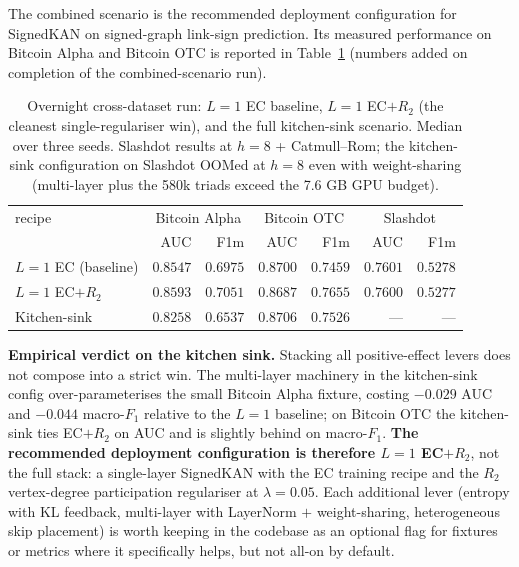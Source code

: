 \documentclass[11pt, a4paper]{article}
\begin{document}
The combined scenario is the recommended deployment configuration
for SignedKAN on signed-graph link-sign prediction. Its measured
performance on Bitcoin Alpha and Bitcoin OTC is reported in
Table~\ref{tab:kitchen-sink} (numbers added on completion of the
combined-scenario run).

\begin{table}[h]
\centering
\caption{Overnight cross-dataset run: $L\!=\!1$ EC baseline,
$L\!=\!1$ EC$+R_2$ (the cleanest single-regulariser win), and the
full kitchen-sink scenario. Median over three seeds. Slashdot
results at $h\!=\!8$ + Catmull--Rom; the kitchen-sink configuration
on Slashdot OOMed at $h\!=\!8$ even with weight-sharing
(multi-layer plus the 580k triads exceed the 7.6 GB GPU budget).}
\label{tab:kitchen-sink}
\begin{tabular}{@{}lrrrrrr@{}}
\toprule
recipe & \multicolumn{2}{c}{Bitcoin Alpha} & \multicolumn{2}{c}{Bitcoin OTC} & \multicolumn{2}{c}{Slashdot} \\
       & AUC & F1m & AUC & F1m & AUC & F1m \\
\midrule
$L\!=\!1$ EC (baseline) & $0.8547$ & $0.6975$ & $0.8700$ & $0.7459$ & $0.7601$ & $0.5278$ \\
$L\!=\!1$ EC$+R_2$      & $\mathbf{0.8593}$ & $\mathbf{0.7051}$ & $0.8687$ & $\mathbf{0.7655}$ & $0.7600$ & $0.5277$ \\
Kitchen-sink            & $0.8258$ & $0.6537$ & $0.8706$ & $0.7526$ & ---  & ---  \\
\bottomrule
\end{tabular}
\end{table}

\textbf{Empirical verdict on the kitchen sink.} Stacking all
positive-effect levers does not compose into a strict win. The
multi-layer machinery in the kitchen-sink config over-parameterises
the small Bitcoin Alpha fixture, costing $-0.029$ AUC and
$-0.044$ macro-$F_1$ relative to the $L\!=\!1$ baseline; on
Bitcoin OTC the kitchen-sink ties EC$+R_2$ on AUC and is slightly
behind on macro-$F_1$. \textbf{The recommended deployment
configuration is therefore $L\!=\!1$ EC$+R_2$}, not the full
stack: a single-layer SignedKAN with the EC training recipe and
the $R_2$ vertex-degree participation regulariser at
$\lambda\!=\!0.05$. Each additional lever (entropy with KL
feedback, multi-layer with LayerNorm $+$ weight-sharing,
heterogeneous skip placement) is worth keeping in the codebase
as an optional flag for fixtures or metrics where it specifically
helps, but not all-on by default.
\end{document}
